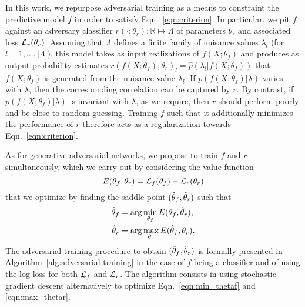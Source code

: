 \documentclass{article}
\theoremstyle{plain}
\begin{document}
In this work, we repurpose adversarial training as a means to constraint the
predictive model $f$ in order to satisfy Eqn.~\ref{eqn:criterion}. In
particular, we pit $f$ against an adversary classifier $r(\cdot ;
\theta_r) : \mathbb{R} \mapsto \Lambda$ of parameters $\theta_r$ and
associated loss ${\cal L}_r(\theta_r)$.
Assuming that $\Lambda$ defines a finite family of nuisance values $\lambda_l$ (for $l=1, \dots, |\Lambda|$),
this model takes as input realizations of $f(X; \theta_f)$
and produces as output probability estimates $r(f(X; \theta_f); \theta_r)_l = \hat{p}(\lambda_l| f(X; \theta_f)) $
that $f(X; \theta_f)$ is generated from the nuisance value $\lambda_l$. If $p(f(X; \theta_f)|\lambda)$ varies with $\lambda$,
then the corresponding correlation can be captured by $r$. By contrast, if
$p(f(X; \theta_f)|\lambda)$ is invariant with $\lambda$, as we require, then $r$
should perform poorly and be close to random guessing. Training $f$ such that it additionally minimizes the performance of $r$
therefore acts as a regularization towards Eqn.~\ref{eqn:criterion}.

As for generative adversarial networks, we propose to
train $f$ and $r$ simultaneously, which we carry out by considering
the value function
\begin{equation}
    E(\theta_f, \theta_r) = {\cal L}_f(\theta_f) - {\cal L}_r(\theta_r)
\end{equation}
that we optimize by finding the saddle point $(\smash{\hat\theta_f}, \smash{\hat\theta_r})$ such that
\begin{align}
    \smash{\hat\theta_f} &= \arg \min_{\theta_f} E(\theta_f, \smash{\hat\theta_r}), \label{eqn:min_thetaf} \\
    \smash{\hat\theta_r} &= \arg \max_{\theta_r} E(\smash{\hat\theta_f}, \theta_r) \label{eqn:max_thetar}.
\end{align}
The adversarial training procedure to obtain $(\smash{\hat\theta_f},
\smash{\hat\theta_r})$ is formally presented in
Algorithm~\ref{alg:adversarial-training} in the case of $f$ being a classifier
and of using the log-loss for both ${\cal L}_f$ and ${\cal L}_r$. The algorithm
consists in using stochastic gradient descent alternatively to optimize
Eqn.~\ref{eqn:min_thetaf} and \ref{eqn:max_thetar}.
\end{document}
